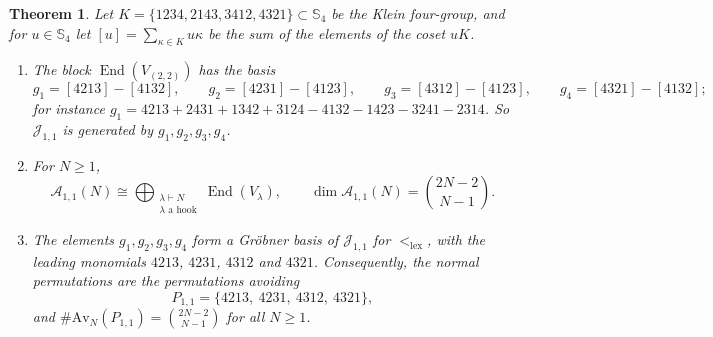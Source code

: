 \documentclass[11pt]{amsart}
\newtheorem{theorem}{Theorem}[section]
\theoremstyle{definition}
\theoremstyle{remark}
\newcommand{\bS}{\mathbb{S}}
\newcommand{\cA}{\mathscr{A}}
\newcommand{\cJ}{\mathscr{J}}
\newcommand{\Av}{\mathrm{Av}}
\newcommand{\lex}{\mathrm{lex}}
\newcommand{\End}{\operatorname{End}}
\begin{document}
\begin{theorem}\label{thm:22}
Let $K=\{1234,2143,3412,4321\}\subset\bS_4$ be the Klein four-group, and for $u\in\bS_4$ let $[u]=\sum_{\kappa\in K}u\kappa$ be the sum of the elements of the coset $uK$.
\begin{enumerate}
\item The block $\End(V_{(2,2)})$ has the basis
\[
g_1=[4213]-[4132],\qquad g_2=[4231]-[4123],\qquad g_3=[4312]-[4123],\qquad g_4=[4321]-[4132];
\]
for instance $g_1=4213+2431+1342+3124-4132-1423-3241-2314$. So $\cJ_{1,1}$ is generated by $g_1,g_2,g_3,g_4$.
\item For $N\ge1$,
\[
\cA_{1,1}(N)\cong\bigoplus_{\substack{\lambda\vdash N\\ \lambda\text{ a hook}}}\End(V_\lambda),\qquad \dim\cA_{1,1}(N)=\binom{2N-2}{N-1}.
\]
\item The elements $g_1,g_2,g_3,g_4$ form a Gr\"obner basis of $\cJ_{1,1}$ for $<_\lex$, with the leading monomials $4213$, $4231$, $4312$ and $4321$. Consequently, the normal permutations are the permutations avoiding
\[
P_{1,1}=\{4213,\ 4231,\ 4312,\ 4321\},
\]
and $\#\Av_N(P_{1,1})=\binom{2N-2}{N-1}$ for all $N\ge1$.
\end{enumerate}
\end{theorem}
\end{document}

